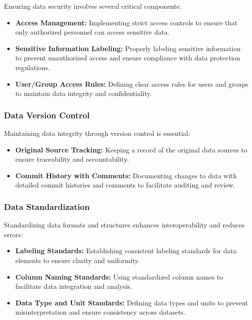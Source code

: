 \documentclass[a4paper, 11pt]{article}
\begin{document}
Ensuring data security involves several critical components:

\begin{itemize}
    \item \textbf{Access Management:} Implementing strict access controls to ensure that only authorized personnel can access sensitive data.
    \item \textbf{Sensitive Information Labeling:} Properly labeling sensitive information to prevent unauthorized access and ensure compliance with data protection regulations.
    \item \textbf{User/Group Access Rules:} Defining clear access rules for users and groups to maintain data integrity and confidentiality.
\end{itemize}

\subsubsection{Data Version Control}

Maintaining data integrity through version control is essential:

\begin{itemize}
    \item \textbf{Original Source Tracking:} Keeping a record of the original data sources to ensure traceability and accountability.
    \item \textbf{Commit History with Comments:} Documenting changes to data with detailed commit histories and comments to facilitate auditing and review.
\end{itemize}

\subsubsection{Data Standardization}

Standardizing data formats and structures enhances interoperability and reduces errors:

\begin{itemize}
    \item \textbf{Labeling Standards:} Establishing consistent labeling standards for data elements to ensure clarity and uniformity.
    \item \textbf{Column Naming Standards:} Using standardized column names to facilitate data integration and analysis.
    \item \textbf{Data Type and Unit Standards:} Defining data types and units to prevent misinterpretation and ensure consistency across datasets.
\end{itemize}
\end{document}
